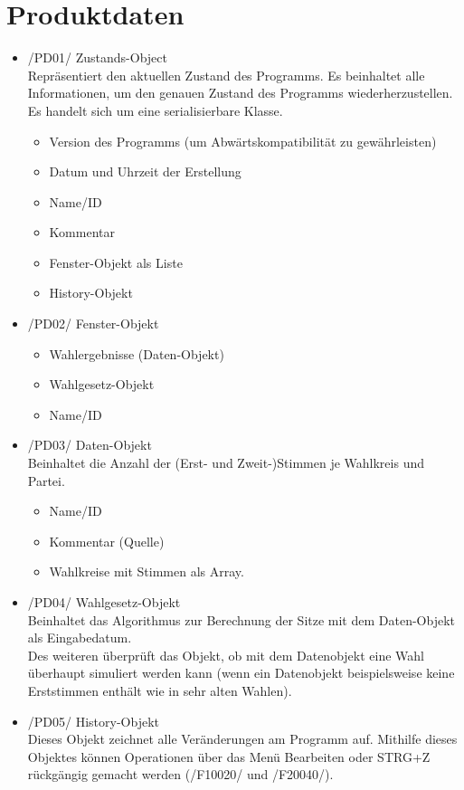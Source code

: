 \documentclass[10pt,a4paper]{article}
\begin{document}
\section{Produktdaten}
\begin{itemize}
	\item /PD01/ Zustands-Object \hfill \\
	Repräsentiert den aktuellen Zustand des Programms. Es beinhaltet alle Informationen, um den genauen Zustand des Programms wiederherzustellen. Es handelt sich um eine serialisierbare Klasse.
	\begin{itemize}
		\item Version des Programms (um Abwärtskompatibilität zu gewährleisten)
		\item Datum und Uhrzeit der Erstellung
		\item Name/ID
		\item Kommentar
		\item Fenster-Objekt als Liste
		\item History-Objekt
	\end{itemize}
	
	\item /PD02/ Fenster-Objekt
	\begin{itemize}
		\item Wahlergebnisse (Daten-Objekt)
		\item Wahlgesetz-Objekt
		\item Name/ID
	\end{itemize}
	
	\item /PD03/ Daten-Objekt \hfill \\
	Beinhaltet die Anzahl der (Erst- und Zweit-)Stimmen je Wahlkreis und Partei.
	\begin{itemize}
		\item Name/ID
		\item Kommentar (Quelle)
		\item Wahlkreise mit Stimmen als Array.
	\end{itemize}
	
	\item /PD04/ Wahlgesetz-Objekt \hfill \\
	Beinhaltet das Algorithmus zur Berechnung der Sitze mit dem Daten-Objekt als Eingabedatum.\\
	Des weiteren überprüft das Objekt, ob mit dem Datenobjekt eine Wahl überhaupt simuliert werden kann (wenn ein Datenobjekt beispielsweise keine Erststimmen enthält wie in sehr alten Wahlen).
	
	\item /PD05/ History-Objekt \hfill \\
	Dieses Objekt zeichnet alle Veränderungen am Programm auf. Mithilfe dieses Objektes können Operationen über das Menü Bearbeiten oder STRG+Z rückgängig gemacht werden (/F10020/ und /F20040/).
\end{itemize}
\end{document}
